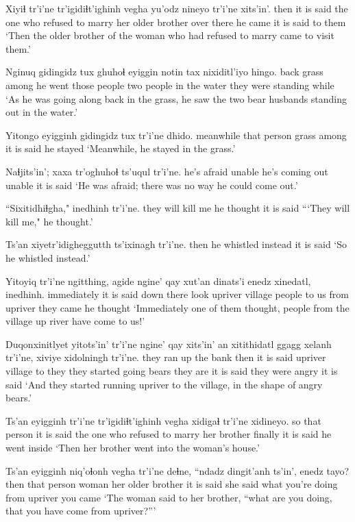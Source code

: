 \documentclass[12pt]{article}
\begin{document}
\gll Xiyiɬ tr'i'ne tr'igidiɬt'ighinh vegha   yu'odz  nineyo tr'i'ne xits'in'.
then {it is said} {the one who refused to marry} {her older brother} {over there} {he came} {it is said} {to them}
\glt `Then the older brother of the woman who had refused to marry came to visit them.'
\glend

\gll Nginuq gidingidz tux ghuhoɬ eyiggin notin tax nixiditl'iyo  hingo.
back  grass  among {he went} {those people} {two people} {in the water} {they were standing} while
\glt `As he was going along back in the grass, he saw the two bear husbands standing out in the water.'
\glend

\gll Yitongo eyigginh gidingidz tux tr'i'ne dhido.
meanwhile {that person} grass among {it is said} {he stayed}
\glt `Meanwhile, he stayed in the grass.'
\glend

\gll Naɬjits'in'; xaxa tr'oghuhoɬ ts'uqul  tr'i'ne.
{he's afraid} unable {he's coming out} unable {it is said}
\glt `He was afraid; there was no way he could come out.'
\glend

\gll ``Sixitidhiɬgha," inedhinh tr'i'ne.
{they will kill me} {he thought} {it is said}
\glt ```They will kill me," he thought.'
\glend

\gll Ts'an  xiyetr'idigheggutth ts'ixinagh tr'i'ne.
then  {he whistled}  instead  {it is said}
\glt `So he whistled instead.'
\glend

\gll Yitoyiq tr'i'ne ngitthing, agide ngine' qay  xut'an dinats'i enedz  xinedatl, inedhinh.
immediately {it is said} {down there} look  upriver  village  people {to us} {from upriver} {they came} {he thought}
\glt `Immediately one of them thought, people from the village up river have come to us!'
\glend

\gll Duqonxinitlyet  yitots'in' tr'i'ne ngine' qay xits'in' an xitithidatl ggagg xelanh tr'i'ne, {xiviye xidolningh} tr'i'ne.
{they ran up the bank}  then  {it is said} upriver village to they {they started going} bears {they are} {it is said} {they were angry} {it is said}
\glt `And they started running upriver to the village, in the shape of angry bears.'
\glend

\gll Ts'an eyigginh tr'i'ne tr'igidiɬt'ighinh   vegha  xidigaɬ tr'i'ne xidineyo.
so {that person} {it is said} {the one who refused to marry} {her brother} finally  {it is said} {he went inside}
\glt `Then her brother went into the woman's house.'
\glend

\gll Ts'an eyigginh niq'oɬonh vegha  tr'i'ne deɬne, ``ndadz dingit'anh ts'in', enedz  tayo?
then {that person} woman {her older brother} {it is said} {she said}  what {you're doing}  from upriver {you came}
\glt `The woman said to her brother, ``what are you doing, that you have come from upriver?'''
\glend
\end{document}
